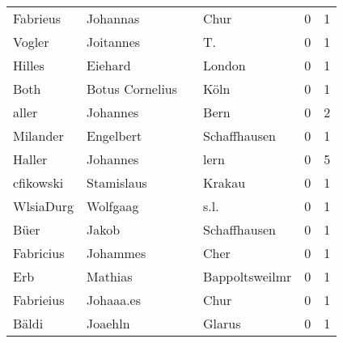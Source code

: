 \begin{center}
\begin{tiny}
\begin{longtabu}{llllrr}
                 Fabrieus &                           Johannas &             &                                        Chur &          0 &         1 \\
                   Vogler &                          Joitannes &             &                                         T.  &          0 &         1 \\
                   Hilles &                            Eiehard &             &                                      London &          0 &         1 \\
                     Both &                    Botus Cornelius &             &                                        Köln &          0 &         1 \\
                    aller &                           Johannes &             &                                        Bern &          0 &         2 \\
                 Milander &                          Engelbert &             &                                Schaffhausen &          0 &         1 \\
                   Haller &                           Johannes &             &                                        lern &          0 &         5 \\
                cfikowski &                         Stamislaus &             &                                      Krakau &          0 &         1 \\
                WlsiaDurg &                           Wolfgaag &             &                                        s.l. &          0 &         1 \\
                     Büer &                              Jakob &             &                                Schaffhausen &          0 &         1 \\
                Fabricius &                           Johammes &             &                                        Cher &          0 &         1 \\
                      Erb &                            Mathias &             &                              Bappoltsweilmr &          0 &         1 \\
                Fabrieius &                          Johaaa.es &             &                                        Chur &          0 &         1 \\
                    Bäldi &                            Joaehln &             &                                      Glarus &          0 &         1 \\

\end{longtabu}
\end{tiny}
\end{center}

